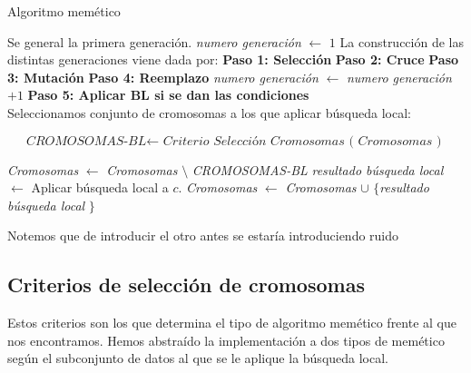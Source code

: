 \begin{algorithm}[H]
    \caption{Algoritmo memético}
    \begin{algorithmic}[1]
        \State Se general la primera generación. 
        \State \textit{numero generación} $\gets$ $1$
        \State La construcción de las distintas generaciones viene dada por: 
        \State \textbf{Paso 1: Selección}
        \State \textbf{Paso 2: Cruce }
        \State \textbf{Paso 3:  Mutación}
        \State \textbf{Paso 4:  Reemplazo}
        \State \textit{numero generación} $\gets$ \textit{numero generación} $+1$
        \State \textbf{Paso 5: Aplicar BL si se dan las condiciones} \\
            \State Seleccionamos conjunto de cromosomas a los que aplicar búsqueda local: 

            \begin{equation*}
                \textit{CROMOSOMAS-BL}  \gets  \textit{ Criterio Selección  Cromosomas ( Cromosomas ) }
            \end{equation*}

            \State\textit{Cromosomas } $\gets$ \textit{Cromosomas } $\setminus$ \textit{CROMOSOMAS-BL}
            \State \textit{resultado búsqueda local } $\gets$ Aplicar búsqueda local a $c$.
            \State\textit{Cromosomas } $\gets$ \textit{Cromosomas } $\cup$ $\{$\textit{resultado búsqueda local } $\}$
            \EndFor
        \EndIf 
        \EndWhile
        
    \end{algorithmic}
    
\end{algorithm}

Notemos que de introducir el otro antes se estaría introduciendo 
ruido

\subsection{ Criterios de selección de cromosomas } 

Estos criterios son los que determina el tipo de algoritmo memético 
frente al que nos encontramos. Hemos abstraído la implementación a dos tipos de memético según el subconjunto de datos al que se le aplique la búsqueda local. 

